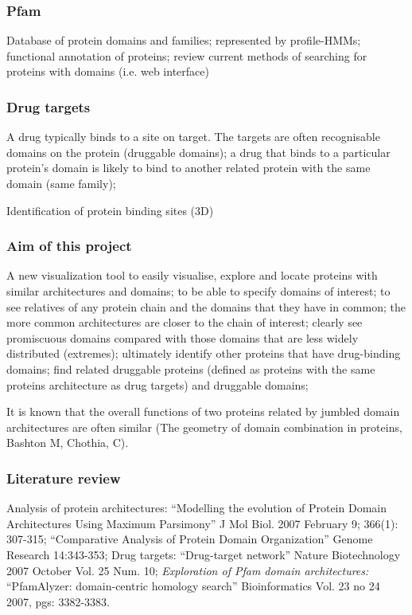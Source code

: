 \subsubsection*{Pfam} Database of protein domains and families; represented by profile-HMMs; functional annotation of proteins; review current methods of searching for proteins with domains (i.e. web interface)

\subsubsection*{Drug targets} A drug typically binds to a site on target. The targets are often recognisable domains on the protein (druggable domains); a drug that binds to a particular protein's domain is likely to bind to another related protein with the same domain (same family);

Identification of protein binding sites (3D)

\subsubsection*{Aim of this project} A new visualization tool to easily visualise, explore and locate proteins with similar architectures and domains; to be able to specify domains of interest; to see relatives of any protein chain and the domains that they have in common; the more common architectures are closer to the chain of interest; clearly see promiscuous domains compared with those domains that are less widely distributed (extremes); ultimately identify other proteins that have drug-binding domains; find related druggable proteins (defined as proteins with the same proteins architecture as drug targets) and druggable domains; 

It is known that the overall functions of two proteins related by jumbled domain architectures are often similar (The geometry of domain combination in proteins, Bashton M, Chothia, C).


\subsubsection*{Literature review} Analysis of protein architectures: ``Modelling the evolution of Protein Domain Architectures Using Maximum Parsimony'' J Mol Biol. 2007 February 9; 366(1): 307-315; ``Comparative Analysis of Protein Domain Organization'' Genome Research 14:343-353; Drug targets: ``Drug-target network'' Nature Biotechnology 2007 October Vol. 25 Num. 10; \emph{Exploration of Pfam domain architectures:} ``PfamAlyzer: domain-centric homology search'' Bioinformatics Vol. 23 no 24 2007, pgs: 3382-3383.

